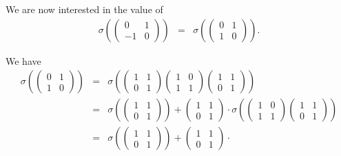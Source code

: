 We are now interested in the value of
\begin{eqnarray*}
\sigma\left(
	\left(\begin{matrix} 0 & 1 \\ -1 & 0 \end{matrix}\right)
\right) &=&
\sigma\left(
	\left(\begin{matrix} 0 & 1 \\ 1 & 0 \end{matrix}\right)
\right).
\end{eqnarray*}

We have
\begin{eqnarray*}
\sigma\left(
	\left(\begin{matrix} 0 & 1 \\ 1 & 0 \end{matrix}\right)
\right) &=&
\sigma\left(
	\left(\begin{matrix} 1 & 1 \\ 0 & 1 \end{matrix}\right)
	\left(\begin{matrix} 1 & 0 \\ 1 & 1 \end{matrix}\right)
	\left(\begin{matrix} 1 & 1 \\ 0 & 1 \end{matrix}\right)
\right) \\
&=&
\sigma\left(
	\left(\begin{matrix} 1 & 1 \\ 0 & 1 \end{matrix}\right)
\right) +
\left(\begin{matrix} 1 & 1 \\ 0 & 1 \end{matrix}\right) \cdot
\sigma\left(
	\left(\begin{matrix} 1 & 0 \\ 1 & 1 \end{matrix}\right)
	\left(\begin{matrix} 1 & 1 \\ 0 & 1 \end{matrix}\right)
\right) \\ 
&=&
\sigma\left(
	\left(\begin{matrix} 1 & 1 \\ 0 & 1 \end{matrix}\right)
\right) +
\left(\begin{matrix} 1 & 1 \\ 0 & 1 \end{matrix}\right) \cdot

\end{eqnarray*}
